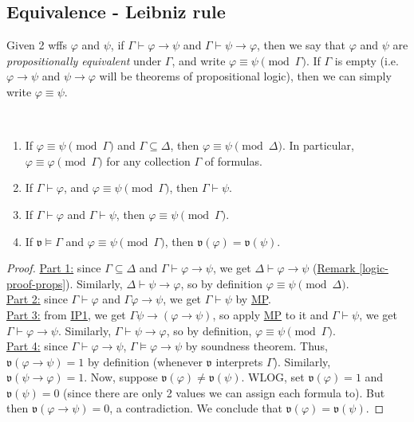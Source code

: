 \documentclass{treatise}
\begin{document}
\subsection{Equivalence - Leibniz rule}
Given 2 wffs $\varphi$ and $\psi$, if $\Gamma \vdash \varphi \to \psi$ and $\Gamma \vdash \psi \to \varphi$, then we say that $\varphi$ and $\psi$ are \emph{propositionally equivalent} under $\Gamma$, and write $\varphi \equiv \psi \pmod{\Gamma}$. If $\Gamma$ is empty (i.e. $\varphi \to \psi$ and $\psi \to \varphi$ will be theorems of propositional logic), then we can simply write $\varphi \equiv \psi$.
\begin{remark} \ 
\begin{enumerate}
    \item If $\varphi \equiv \psi \pmod{\Gamma}$ and $\Gamma \subseteq \Delta$, then $\varphi \equiv \psi \pmod{\Delta}$. In particular, $\varphi \equiv \varphi \pmod{\Gamma}$ for any collection $\Gamma$ of formulas.
    \item If $\Gamma \vdash \varphi$, and $\varphi \equiv \psi \pmod{\Gamma}$, then $\Gamma \vdash \psi$.
    \item If $\Gamma \vdash \varphi$ and $\Gamma \vdash \psi$, then $\varphi \equiv \psi \pmod{\Gamma}$.
    \item If $\mathfrak{v} \vDash \Gamma$ and $\varphi \equiv \psi \pmod{\Gamma}$, then $\mathfrak{v}(\varphi) = \mathfrak{v}(\psi)$.
\end{enumerate}
\end{remark}
\begin{proof}
\underline{Part 1:} since $\Gamma \subseteq \Delta$ and $\Gamma \vdash \varphi \to \psi$, we get $\Delta \vdash \varphi \to \psi$ (\hyperref[logic-proof-props]{Remark \ref*{logic-proof-props}}). Similarly, $\Delta \vdash \psi \to \varphi$, so by definition $\varphi \equiv \psi \pmod{\Delta}$.
\\
\underline{Part 2:} since $\Gamma \vdash \varphi$ and $\Gamma \varphi \to \psi$, we get $\Gamma \vdash \psi$ by \hyperref[HPL-R-MP]{MP}.
\\
\underline{Part 3:} from \hyperref[HPL-A-IP1]{IP1}, we get $\Gamma \psi \to (\varphi \to \psi)$, so apply \hyperref[HPL-R-MP]{MP} to it and $\Gamma \vdash \psi$, we get $\Gamma \vdash \varphi \to \psi$. Similarly, $\Gamma \vdash \psi \to \varphi$, so by definition, $\varphi \equiv \psi \pmod{\Gamma}$.
\\
\underline{Part 4:} since $\Gamma \vdash \varphi \to \psi$, $\Gamma \vDash \varphi \to \psi$ by soundness theorem. Thus, $\mathfrak{v}(\varphi \to \psi) = 1$ by definition (whenever $\mathfrak{v}$ interprets $\Gamma$). Similarly, $\mathfrak{v}(\psi \to \varphi) = 1$. Now, suppose $\mathfrak{v}(\varphi) \neq \mathfrak{v}(\psi)$. WLOG, set $\mathfrak{v}(\varphi) = 1$ and $\mathfrak{v}(\psi) = 0$ (since there are only 2 values we can assign each formula to). But then $\mathfrak{v}(\varphi \to \psi) = 0$, a contradiction. We conclude that $\mathfrak{v}(\varphi) = \mathfrak{v}(\psi)$.
\end{proof}
\end{document}
